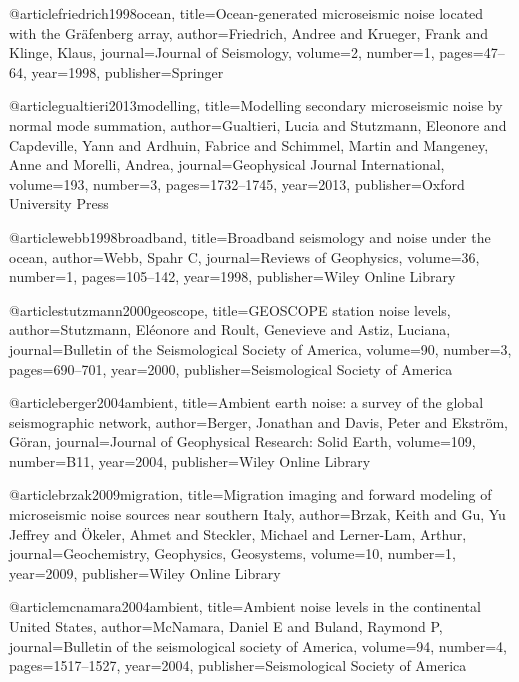 @article{friedrich1998ocean,
  title={Ocean-generated microseismic noise located with the Gr{\"a}fenberg array},
  author={Friedrich, Andree and Krueger, Frank and Klinge, Klaus},
  journal={Journal of Seismology},
  volume={2},
  number={1},
  pages={47--64},
  year={1998},
  publisher={Springer}
}

@article{gualtieri2013modelling,
  title={Modelling secondary microseismic noise by normal mode summation},
  author={Gualtieri, Lucia and Stutzmann, Eleonore and Capdeville, Yann and Ardhuin, Fabrice and Schimmel, Martin and Mangeney, Anne and Morelli, Andrea},
  journal={Geophysical Journal International},
  volume={193},
  number={3},
  pages={1732--1745},
  year={2013},
  publisher={Oxford University Press}
}

@article{webb1998broadband,
  title={Broadband seismology and noise under the ocean},
  author={Webb, Spahr C},
  journal={Reviews of Geophysics},
  volume={36},
  number={1},
  pages={105--142},
  year={1998},
  publisher={Wiley Online Library}
}

@article{stutzmann2000geoscope,
  title={GEOSCOPE station noise levels},
  author={Stutzmann, El{\'e}onore and Roult, Genevieve and Astiz, Luciana},
  journal={Bulletin of the Seismological Society of America},
  volume={90},
  number={3},
  pages={690--701},
  year={2000},
  publisher={Seismological Society of America}
}

@article{berger2004ambient,
  title={Ambient earth noise: a survey of the global seismographic network},
  author={Berger, Jonathan and Davis, Peter and Ekstr{\"o}m, G{\"o}ran},
  journal={Journal of Geophysical Research: Solid Earth},
  volume={109},
  number={B11},
  year={2004},
  publisher={Wiley Online Library}
}

@article{brzak2009migration,
  title={Migration imaging and forward modeling of microseismic noise sources near southern Italy},
  author={Brzak, Keith and Gu, Yu Jeffrey and {\"O}keler, Ahmet and Steckler, Michael and Lerner-Lam, Arthur},
  journal={Geochemistry, Geophysics, Geosystems},
  volume={10},
  number={1},
  year={2009},
  publisher={Wiley Online Library}
}


@article{mcnamara2004ambient,
  title={Ambient noise levels in the continental United States},
  author={McNamara, Daniel E and Buland, Raymond P},
  journal={Bulletin of the seismological society of America},
  volume={94},
  number={4},
  pages={1517--1527},
  year={2004},
  publisher={Seismological Society of America}
}











